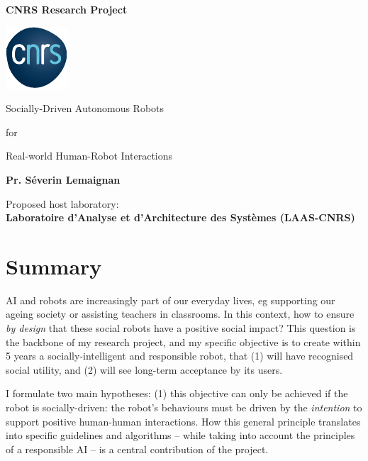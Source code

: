 \documentclass[12pt,a4paper]{article}
\title{\project}
\begin{document}
\begin{center}

    \textbf{\LARGE CNRS Research Project}

    \vspace{1cm}
    \includegraphics[width=0.2\linewidth]{CNRS.pdf}


    \vspace{3cm}
    {\Huge Socially-Driven Autonomous Robots}

    \vspace{0.5cm}
    {\LARGE for}

    \vspace{0.5cm}
    {\Huge Real-world Human-Robot Interactions}

    \vspace{2cm}
    {\LARGE\bf Pr. Séverin Lemaignan}

    \vspace{3cm}
    {\Large Proposed host laboratory:\\ \bf Laboratoire d'Analyse et d'Architecture des Systèmes (LAAS-CNRS)}
\end{center}

    \vspace{3cm}

\newpage

\section*{Summary}\label{abstract}


AI and robots are increasingly part of our
everyday lives, eg supporting our ageing society or assisting teachers in
classrooms. In this context, how to ensure \emph{by design} that these social robots
have a positive social impact? This question is the backbone of my
research project, and my specific objective is to create within 5 years
a socially-intelligent and responsible robot, that (1) will have recognised
social utility, and (2) will see long-term acceptance by its users.

I formulate two main hypotheses: (1) this objective can only be achieved if the
robot is socially-driven: the robot's behaviours must be driven by the
\emph{intention} to support positive human-human interactions. How this general principle
translates into specific guidelines and algorithms -- while taking into account
the principles of a responsible AI -- is a central contribution of the project.
\end{document}
